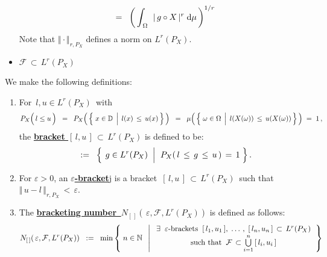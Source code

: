 \begin{definition}
\begin{itemize}
\begin{equation*}
	\; = \;\;
		\left(\,\int_{\,\Omega}\;\, \vert\,g \circ X\,\vert^{r} \;\textnormal{d}\mu\,\right)^{1/r}
	\end{equation*}
	Note that $\Vert\cdot\Vert_{r,P_{X}}$ defines a norm on $L^{r}(P_{X})$. 
\item
	$\mathcal{F} \,\subset\, L^{r}(P_{X})$
\end{itemize}
We make the following definitions:
\begin{enumerate}
\item
	For \,$l, u \in L^{r}(P_{X})$\, with
	\begin{equation*}
	P_{X}\!\left(\,l \overset{{\color{white}.}}{\leq} u\,\right)
	\;\;=\;\;
		P_{X}\!\left(\,\left\{\,\left. x\overset{{\color{white}.}}{\in}\D \;\,\right\vert\; l(x) \,\leq\, u(x)\,\right\}\,\right)
	\;\;=\;\;
		\mu\!\left(\,\left\{\,
			\left.
			\omega\overset{{\color{white}.}}{\in}\Omega
			\;\,\right\vert\;
			l(X(\omega)) \,\leq\, u(X(\omega))
		\,\right\}\,\right)
	\;=\; 1\,,
	\end{equation*}
	the \underline{\textbf{bracket $[\,l,u\,] \,\subset\,L^{r}(P_{X})$}} is defined to be:
	\begin{equation*}
	[\,l,u\,]
	\;\; := \;\;
		\left\{\;
		\left.
			g \overset{{\color{white}.}}{\in} L^{r}(P_{X})
		\;\;\right\vert\;\,
			P_{X}(\,l \,\overset{{\color{white}.}}{\leq}\, g \,\leq\, u\,) \,=\, 1
		\;\right\}.
	\end{equation*}
\item
	For $\varepsilon > 0$, an \underline{\textbf{$\varepsilon$-bracket}{\color{white}j}}
	is a bracket \,$[\,l,u\,] \,\subset\, L^{r}(P_{X})$\, such that
	\,$\Vert\,u-l\,\Vert_{r,P_{X}} \,<\,\varepsilon$.
\item
	The \underline{\textbf{bracketing number
	\,$N_{[\,]}\!\left(\,\varepsilon,\mathcal{F},L^{r}(P_{X})\right)$}}
	is defined as follows:
	\begin{equation*}
	N_{[\,]}\!\left(\,\varepsilon,\mathcal{F},L^{r}(P_{X})\right)
	\;\; := \;\;
		\min\left\{\;
			n \overset{{\color{white}.}}{\in} \N
		\;\;\left\vert\;
			\begin{array}{c}
				\exists\;\; \textnormal{$\varepsilon$-brackets}\;\;
				[\,l_{1},u_{1}\,],\; \ldots\,,\; [\,l_{n},u_{n}\,] \,\subset\, L^{r}(P_{X})
			\\
				\overset{{\color{white}1}}{\textnormal{such that}}\;\;
				\mathcal{F} \,\subset \overset{n}{\underset{i=1}{\bigcup}}\,[\,l_{i},u_{i}\,]
			\end{array}
		\right.
		\right\}
	\end{equation*}
\end{enumerate}
\end{definition}

